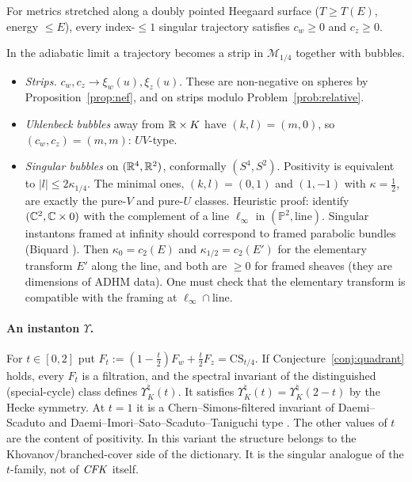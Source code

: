 \begin{conjecture}\label{conj:quadrant}
For metrics stretched along a doubly pointed Heegaard surface ($T\ge T(E)$, energy $\le E$), every index-$\le1$ singular
trajectory satisfies $c_w\ge0$ and $c_z\ge0$.
\end{conjecture}
In the adiabatic limit a trajectory becomes a strip in $\mathcal M_{1/4}$ together with bubbles.
\begin{itemize}[leftmargin=2em]
\item \emph{Strips.} $c_w,c_z\to\xi_w(u),\xi_z(u)$.  These are non-negative on spheres by Proposition~\ref{prop:nef}, and on
strips modulo Problem~\ref{prob:relative}.
\item \emph{Uhlenbeck bubbles} away from $\mathbb{R}\times K$ have $(k,l)=(m,0)$, so $(c_w,c_z)=(m,m)$: $UV$-type.
\item \emph{Singular bubbles} on $(\mathbb{R}^4,\mathbb{R}^2)$, conformally $(S^4,S^2)$.  Positivity is equivalent to
$|l|\le2\kappa_{1/4}$.  The minimal ones, $(k,l)=(0,1)$ and $(1,-1)$ with $\kappa=\tfrac12$, are exactly the pure-$V$ and pure-$U$
classes.  Heuristic proof: identify $(\mathbb{C}^2,\mathbb{C}\times0)$ with the complement of a line $\ell_\infty$ in
$(\mathbb P^2,\text{line})$.  Singular instantons framed at infinity should correspond to framed parabolic bundles
(Biquard \cite{Biquard}).  Then $\kappa_0=c_2(E)$ and $\kappa_{1/2}=c_2(E')$ for the elementary transform $E'$ along the line, and both are
$\ge0$ for framed sheaves (they are dimensions of ADHM data).  One must check that the elementary transform is
compatible with the framing at $\ell_\infty\cap\text{line}$.
\end{itemize}

\paragraph{An instanton $\Upsilon$.}
For $t\in[0,2]$ put $F_t:=(1-\frac t2)F_w+\frac t2F_z=\mathrm{CS}_{t/4}$.  If Conjecture~\ref{conj:quadrant} holds, every $F_t$ is a
filtration, and the spectral invariant of the distinguished (special-cycle) class defines $\Upsilon^\natural_K(t)$.  It
satisfies $\Upsilon^\natural_K(t)=\Upsilon^\natural_K(2-t)$ by the Hecke symmetry.  At $t=1$ it is a Chern--Simons-filtered invariant of
Daemi--Scaduto and Daemi--Imori--Sato--Scaduto--Taniguchi type \cite{DS-clasp,DISST}.  The other values of $t$ are the
content of positivity.  In this variant the structure belongs to the Khovanov/branched-cover side of the dictionary.
It is the singular analogue of the $t$-family, not of $\mathit{CFK}$ itself.
